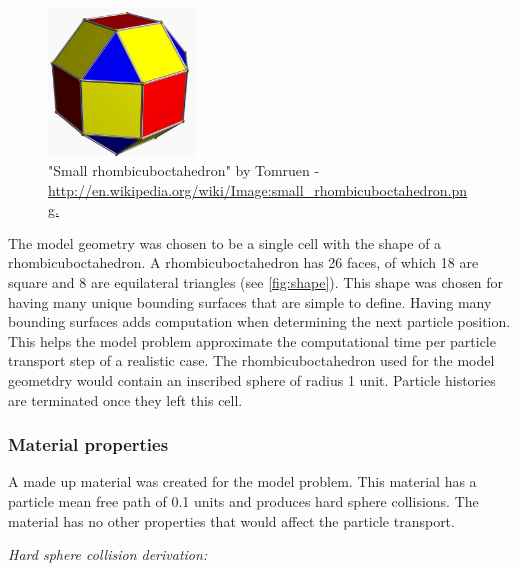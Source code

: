 \documentclass{mc2015}
\begin{document}
\begin{figure}[h]
	\centering
		\includegraphics[width=0.35\textwidth]{Small_rhombicuboctahedron.png}
		\caption{\small "Small rhombicuboctahedron" by Tomruen -
			\url{http://en.wikipedia.org/wiki/Image:small_rhombicuboctahedron.png.}}
		\label{fig:shape}
\end{figure}

The model geometry was chosen to be a single cell with the shape of a rhombicuboctahedron.
A rhombicuboctahedron has 26 faces,
of which 18 are square and 8 are equilateral triangles (see \autoref{fig:shape}).
This shape was chosen for having many unique bounding surfaces that are simple to define.
Having many bounding surfaces adds computation
when determining the next particle position.
This helps the model problem approximate the computational time
per particle transport step of a realistic case.
The rhombicuboctahedron used for the model geometdry would contain
an inscribed sphere of radius 1 unit.
Particle histories are terminated once they left this cell.

\subsubsection{Material properties}

A made up material was created for the model problem.
This material has a particle mean free path of 0.1 units and produces
hard sphere collisions.
The material has no other properties that would affect the particle transport.

\noindent
\emph{Hard sphere collision derivation:}
\end{document}
